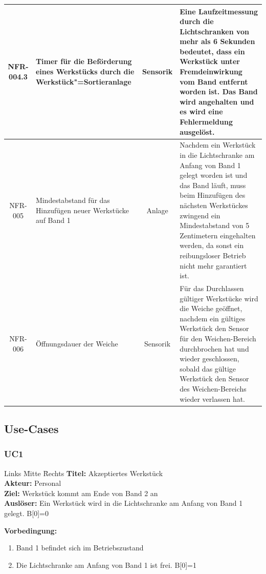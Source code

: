 \documentclass[oneside,a4paper,titlepage]{scrartcl}              %
\begin{document}
\begin{small}
\begin{center}
\begin{longtable}{|c|p{4cm}|c|p{7cm}|}
      \hline
      \rowcolor{lightgray} NFR-004.3 & Timer für die Beförderung eines Werkstücks durch die Werkstück"=Sortieranlage & Sensorik & Eine Laufzeitmessung durch die Lichtschranken von mehr als 6 Sekunden bedeutet, dass ein Werkstück unter Fremdeinwirkung vom Band entfernt worden ist. Das Band wird angehalten und es wird eine Fehlermeldung ausgelöst.\\
      \hline
      NFR-005 & Mindestabstand für das Hinzufügen neuer Werkstücke auf Band 1 & Anlage & Nachdem ein Werkstück in die Lichtschranke am Anfang von Band 1 gelegt worden ist und das Band läuft, muss beim Hinzufügen des nächsten Werkstückes zwingend ein Mindestabstand von 5 Zentimetern eingehalten werden, da sonst ein reibungsloser Betrieb nicht mehr garantiert ist.\\
      \hline
      \rowcolor{lightgray} NFR-006 & Öffnungsdauer der Weiche & Sensorik & Für das Durchlassen gültiger Werkstücke wird die Weiche geöffnet, nachdem ein gültiges Werkstück den Sensor
      für den Weichen-Bereich durchbrochen hat und wieder geschlossen, sobald das
      gültige Werkstück den Sensor des Weichen-Bereichs wieder verlassen hat.\\
      \hline
    \end{longtable}
  \end{center}
\end{small}

\subsection{Use-Cases}

\subsubsection{UC1}
\begin{tabbing}
  Links \= Mitte \= Rechts \kill
  \textbf{Titel:}    \> \> Akzeptiertes Werkstück\\
  \textbf{Akteur:}   \> \> Personal\\
  \textbf{Ziel:}     \> \> Werkstück kommt am Ende von Band 2 an\\
  \textbf{Auslöser:} \> \> Ein Werkstück wird in die Lichtschranke am Anfang von Band 1 gelegt. B[0]=0\\
\end{tabbing}

\textbf{Vorbedingung:}
\begin{enumerate}
  \item Band 1 befindet sich im Betriebszustand
  \item Die Lichtschranke am Anfang von Band 1 ist frei. B[0]=1
\end{enumerate}
\end{document}
